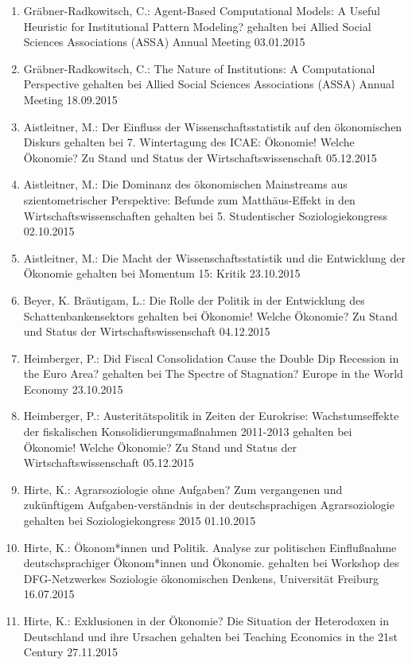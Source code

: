 \begin{enumerate}
	\item Gräbner-Radkowitsch, C.: Agent-Based Computational Models: A Useful Heuristic for Institutional Pattern Modeling? gehalten bei Allied Social Sciences Associations (ASSA) Annual Meeting 03.01.2015
	\item Gräbner-Radkowitsch, C.: The Nature of Institutions: A Computational Perspective gehalten bei Allied Social Sciences Associations (ASSA) Annual Meeting 18.09.2015
	\item Aistleitner, M.: Der Einfluss der Wissenschaftsstatistik auf den ökonomischen Diskurs gehalten bei 7. Wintertagung des ICAE: Ökonomie! Welche Ökonomie? Zu Stand und Status der Wirtschaftswissenschaft 05.12.2015
	\item Aistleitner, M.: Die Dominanz des ökonomischen Mainstreams aus szientometrischer Perspektive: Befunde zum \glqq Matthäus-Effekt\grqq{} in den Wirtschaftswissenschaften gehalten bei 5. Studentischer Soziologiekongress 02.10.2015
	\item Aistleitner, M.: Die Macht der Wissenschaftsstatistik und die Entwicklung der Ökonomie gehalten bei Momentum 15: Kritik 23.10.2015
	\item Beyer, K. Bräutigam, L.: Die Rolle der Politik in der Entwicklung des Schattenbankensektors gehalten bei Ökonomie! Welche Ökonomie? Zu Stand und Status der Wirtschaftswissenschaft 04.12.2015
	\item Heimberger, P.: Did Fiscal Consolidation Cause the Double Dip Recession in the Euro Area? gehalten bei The Spectre of Stagnation? Europe in the World Economy 23.10.2015
	\item Heimberger, P.: Austeritätspolitik in Zeiten der Eurokrise: Wachstumseffekte der fiskalischen Konsolidierungsmaßnahmen 2011-2013 gehalten bei Ökonomie! Welche Ökonomie? Zu Stand und Status der Wirtschaftswissenschaft 05.12.2015
	\item Hirte, K.: Agrarsoziologie ohne Aufgaben? Zum vergangenen und zukünftigem Aufgaben-verständnis in der deutschsprachigen Agrarsoziologie gehalten bei Soziologiekongress 2015 01.10.2015
	\item Hirte, K.: Ökonom*innen und Politik. Analyse zur politischen Einflußnahme deutschsprachiger Ökonom*innen und Ökonomie. gehalten bei Workshop des DFG-Netzwerkes Soziologie ökonomischen Denkens, Universität Freiburg 16.07.2015
	\item Hirte, K.: Exklusionen in der Ökonomie? Die Situation der Heterodoxen in Deutschland und ihre Ursachen gehalten bei Teaching Economics in the 21st Century 27.11.2015

\end{enumerate}
